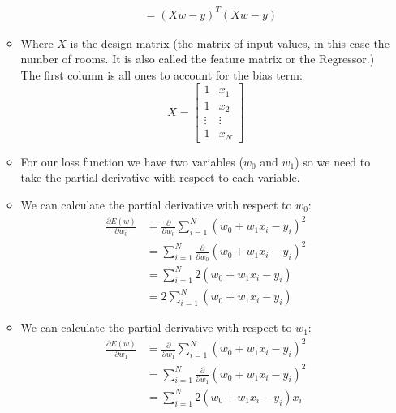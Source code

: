 \documentclass[12pt]{article}
\begin{document}
\begin{itemize}
\begin{itemize}
\begin{align*}
                            &= {(Xw - y)}^T(Xw - y)
                        \end{align*}
                        \item Where $X$ is the design matrix (the matrix of input values, in this case the number of rooms. It is also called the feature matrix or the Regressor.) The first column is all ones to account for the bias term:
                        \begin{equation}
                            X = \begin{bmatrix}
                                1 & x_1\\
                                1 & x_2\\
                                \vdots & \vdots\\
                                1 & x_N
                            \end{bmatrix}
                        \end{equation}
                        \item For our loss function we have two variables ($w_0$ and $w_1$) so we need to take the partial derivative with respect to each variable.
                        \item We can calculate the partial derivative with respect to $w_0$:
                        \begin{align*}
                            \frac{\partial E(w)}{\partial w_0} &= \frac{\partial}{\partial w_0} \sum_{i=1}^N {(w_0 + w_1x_i - y_i)}^2\\
                            &= \sum_{i=1}^N \frac{\partial}{\partial w_0} {(w_0 + w_1x_i - y_i)}^2\\
                            &= \sum_{i=1}^N 2(w_0 + w_1x_i - y_i)\\
                            &= 2 \sum_{i=1}^N (w_0 + w_1x_i - y_i)
                        \end{align*}
                        \item We can calculate the partial derivative with respect to $w_1$:
                        \begin{align*}
                            \frac{\partial E(w)}{\partial w_1} &= \frac{\partial}{\partial w_1} \sum_{i=1}^N {(w_0 + w_1x_i - y_i)}^2\\
                            &= \sum_{i=1}^N \frac{\partial}{\partial w_1} {(w_0 + w_1x_i - y_i)}^2\\
                            &= \sum_{i=1}^N 2(w_0 + w_1x_i - y_i)x_i\\

\end{align*}
\end{itemize}
\end{itemize}
\end{document}
